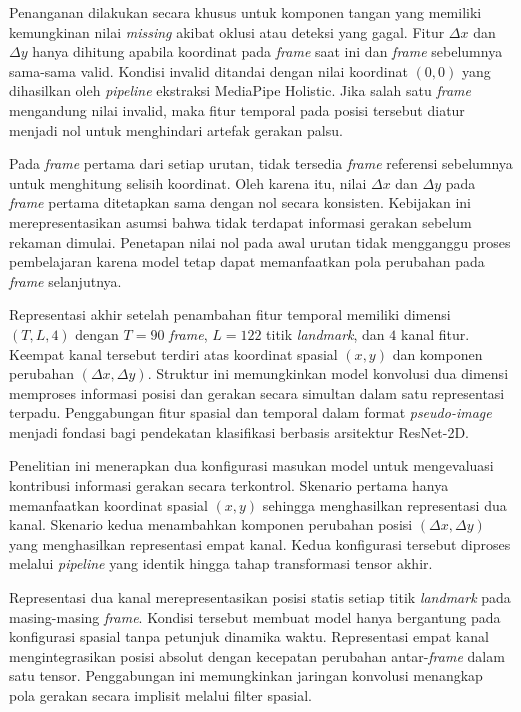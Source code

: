 Penanganan dilakukan secara khusus untuk komponen tangan yang memiliki kemungkinan nilai \textit{missing} akibat oklusi atau deteksi yang gagal. 
Fitur $\Delta x$ dan $\Delta y$ hanya dihitung apabila koordinat pada \textit{frame} saat ini dan \textit{frame} sebelumnya sama-sama valid. 
Kondisi invalid ditandai dengan nilai koordinat $(0, 0)$ yang dihasilkan oleh \textit{pipeline} ekstraksi MediaPipe Holistic. 
Jika salah satu \textit{frame} mengandung nilai invalid, maka fitur temporal pada posisi tersebut diatur menjadi nol untuk menghindari artefak gerakan palsu.

Pada \textit{frame} pertama dari setiap urutan, tidak tersedia \textit{frame} referensi sebelumnya untuk menghitung selisih koordinat. 
Oleh karena itu, nilai $\Delta x$ dan $\Delta y$ pada \textit{frame} pertama ditetapkan sama dengan nol secara konsisten. 
Kebijakan ini merepresentasikan asumsi bahwa tidak terdapat informasi gerakan sebelum rekaman dimulai. 
Penetapan nilai nol pada awal urutan tidak mengganggu proses pembelajaran karena model tetap dapat memanfaatkan pola perubahan pada \textit{frame} selanjutnya.

Representasi akhir setelah penambahan fitur temporal memiliki dimensi $(T, L, 4)$ dengan $T=90$ \textit{frame}, $L=122$ titik \textit{landmark}, dan $4$ kanal fitur. 
Keempat kanal tersebut terdiri atas koordinat spasial $(x, y)$ dan komponen perubahan $(\Delta x, \Delta y)$. 
Struktur ini memungkinkan model konvolusi dua dimensi memproses informasi posisi dan gerakan secara simultan dalam satu representasi terpadu. 
Penggabungan fitur spasial dan temporal dalam format \textit{pseudo-image} menjadi fondasi bagi pendekatan klasifikasi berbasis arsitektur ResNet-2D.

Penelitian ini menerapkan dua konfigurasi masukan model untuk mengevaluasi kontribusi informasi gerakan secara terkontrol. 
Skenario pertama hanya memanfaatkan koordinat spasial $(x, y)$ sehingga menghasilkan representasi dua kanal. 
Skenario kedua menambahkan komponen perubahan posisi $(\Delta x, \Delta y)$ yang menghasilkan representasi empat kanal. 
Kedua konfigurasi tersebut diproses melalui \textit{pipeline} yang identik hingga tahap transformasi tensor akhir.

Representasi dua kanal merepresentasikan posisi statis setiap titik \textit{landmark} pada masing-masing \textit{frame}. 
Kondisi tersebut membuat model hanya bergantung pada konfigurasi spasial tanpa petunjuk dinamika waktu. 
Representasi empat kanal mengintegrasikan posisi absolut dengan kecepatan perubahan antar-\textit{frame} dalam satu tensor. 
Penggabungan ini memungkinkan jaringan konvolusi menangkap pola gerakan secara implisit melalui filter spasial.


